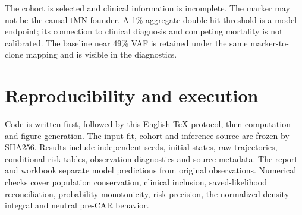 \documentclass[11pt]{article}
\begin{document}
The cohort is selected and clinical information is incomplete. The marker may not be the causal tMN founder. A 1\% aggregate double-hit threshold is a model endpoint; its connection to clinical diagnosis and competing mortality is not calibrated. The baseline near 49\% VAF is retained under the same marker-to-clone mapping and is visible in the diagnostics.

\section{Reproducibility and execution}
Code is written first, followed by this English TeX protocol, then computation and figure generation. The input fit, cohort and inference source are frozen by SHA256. Results include independent seeds, initial states, raw trajectories, conditional risk tables, observation diagnostics and source metadata.
The report and workbook separate model predictions from original observations. Numerical checks cover population conservation, clinical inclusion, saved-likelihood reconciliation, probability monotonicity, risk precision, the normalized density integral and neutral pre-CAR behavior.
\end{document}
